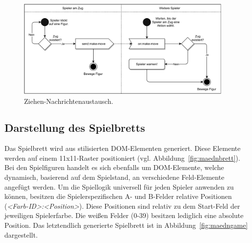 \vspace{6pt}
\begin{figure}[h]
\centering
\includegraphics[width=0.95\textwidth]{bilder/PDF_SVG/MAEDN_ZIEHEN.pdf}
\caption{Ziehen-Nachrichtenaustausch.}
\label{fig:maednziehen}
\end{figure}

\subsection{Darstellung des Spielbretts}
Das Spielbrett wird aus stilisierten \acf{DOM}-Elementen generiert. Diese Elemente werden auf einem 11x11-Raster positioniert (vgl. Abbildung~\ref{fig:maednbrett}). Bei den Spielfiguren handelt es sich ebenfalls um \acs{DOM}-Elemente, welche dynamisch, basierend auf dem Spielstand, an verschiedene Feld-Elemente angefügt werden. Um die Spiellogik universell für jeden Spieler anwenden zu können, besitzen die Spielerspezifischen A- und B-Felder \glqq{}relative\grqq{} Positionen (\textit{<Farb-ID>:<Position>}). Diese Positionen sind relativ zu dem Start-Feld der jeweiligen Spielerfarbe. Die \glqq{}weißen\grqq{} Felder (0-39) besitzen lediglich eine \glqq{}absolute\grqq{} Position. Das letztendlich generierte Spielbrett ist in Abbildung~\ref{fig:maedngame} dargestellt.\par

